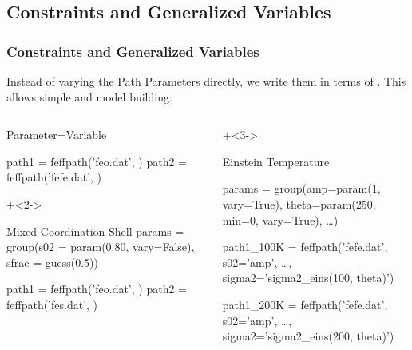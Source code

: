 \subsection{Constraints and Generalized Variables}
\begin{frame}[fragile] \frametitle{Constraints and Generalized Variables}

  \begin{cenpage}{135mm}

  Instead of varying the Path Parameters directly, we write them in terms of
  {}.  This allows simple {} and model building:

\begin{columns}[T]
  \begin{column}{53mm}

  \begin{CodeBlock}{50mm}{Parameter=Variable}
{}
{}

path1  = feffpath('feo.dat', {})
path2  = feffpath('fefe.dat', {})
  \end{CodeBlock}
  \hspace{1mm}   \vmm

  \onslide+<2->
  \begin{CodeBlock}{50mm}{Mixed Coordination Shell}
{}
params = group(s02   = param(0.80, vary=False),
               sfrac = guess(0.5))

path1 = feffpath('feo.dat', {})
path2 = feffpath('fes.dat', {})
  \end{CodeBlock}

  \vmm

  \end{column}
  \begin{column}{57mm}
    \onslide+<3->
  \begin{CodeBlock}{55mm}{Einstein Temperature }
{}

params = group(amp=param(1, vary=True),
               theta=param(250, min=0, vary=True), \ldots)

path1_100K = feffpath('fefe.dat', s02='amp', \ldots,
                      sigma2='sigma2_eins(100, theta)')

path1_200K = feffpath('fefe.dat', s02='amp', \ldots,
                      sigma2='sigma2_eins(200, theta)')


\end{CodeBlock}
\end{column}
\end{columns}
\end{cenpage}
\end{frame}
